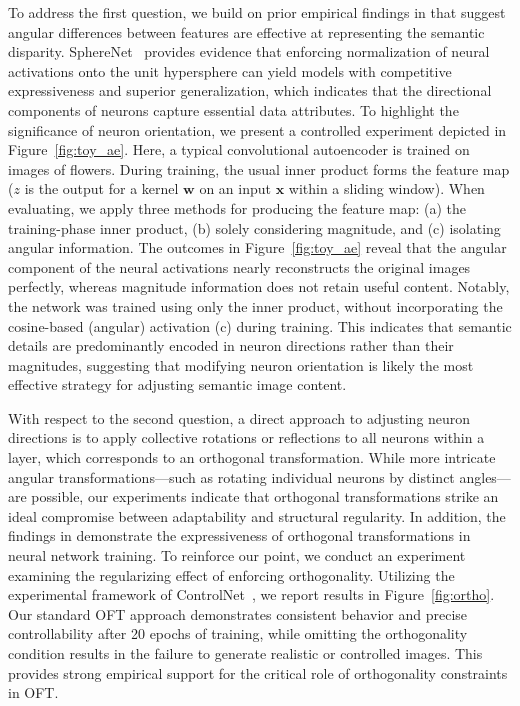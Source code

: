 To address the first question, we build on prior empirical findings in \cite{liu2018decoupled,chen2020angular} that suggest angular differences between features are effective at representing the semantic disparity. SphereNet~\cite{liu2017deep} provides evidence that enforcing normalization of neural activations onto the unit hypersphere can yield models with competitive expressiveness and superior generalization, which indicates that the directional components of neurons capture essential data attributes. To highlight the significance of neuron orientation, we present a controlled experiment depicted in Figure~\ref{fig:toy_ae}. Here, a typical convolutional autoencoder is trained on images of flowers. During training, the usual inner product forms the feature map ($z$ is the output for a kernel $\bm{w}$ on an input $\bm{x}$ within a sliding window). When evaluating, we apply three methods for producing the feature map: (a) the training-phase inner product, (b) solely considering magnitude, and (c) isolating angular information. The outcomes in Figure~\ref{fig:toy_ae} reveal that the angular component of the neural activations nearly reconstructs the original images perfectly, whereas magnitude information does not retain useful content. Notably, the network was trained using only the inner product, without incorporating the cosine-based (angular) activation (c) during training. This indicates that semantic details are predominantly encoded in neuron directions rather than their magnitudes, suggesting that modifying neuron orientation is likely the most effective strategy for adjusting semantic image content.

With respect to the second question, a direct approach to adjusting neuron directions is to apply collective rotations or reflections to all neurons within a layer, which corresponds to an orthogonal transformation. While more intricate angular transformations—such as rotating individual neurons by distinct angles—are possible, our experiments indicate that orthogonal transformations strike an ideal compromise between adaptability and structural regularity. In addition, the findings in \cite{liu2021orthogonal} demonstrate the expressiveness of orthogonal transformations in neural network training. To reinforce our point, we conduct an experiment examining the regularizing effect of enforcing orthogonality. Utilizing the experimental framework of ControlNet~\cite{zhang2023adding}, we report results in Figure~\ref{fig:ortho}. Our standard OFT approach demonstrates consistent behavior and precise controllability after 20 epochs of training, while omitting the orthogonality condition results in the failure to generate realistic or controlled images. This provides strong empirical support for the critical role of orthogonality constraints in OFT.

